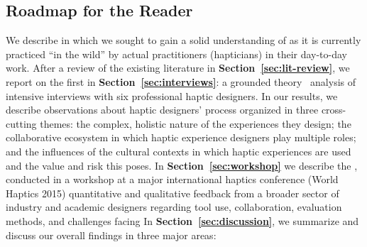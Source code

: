\subsection{Roadmap for the Reader}
\noindent
We describe  in which we sought to gain a solid understanding of %
\haxd as it is currently practiced ``in the wild'' by actual practitioners (hapticians) in their day-to-day work.
After a review of the existing literature in \textbf{Section~\ref{sec:lit-review}},
we report on the first  in \textbf{Section~\ref{sec:interviews}}: a grounded theory~\citep{Corbin2008} analysis of intensive interviews with six professional haptic designers.
In our results, we describe observations about haptic designers' process 
organized in three cross-cutting themes:
the complex, holistic nature of the experiences they design; 
the collaborative ecosystem in which haptic experience designers play multiple roles; 
and the influences of the cultural contexts in which haptic experiences are used and the value and risk this poses.
%
In \textbf{Section~\ref{sec:workshop}} we describe the , conducted in a workshop at a major international haptics conference (World Haptics 2015) quantitative and qualitative feedback from a broader sector of industry and academic designers regarding tool use, collaboration, evaluation methods, and challenges facing 
%
In \textbf{Section~\ref{sec:discussion}}, we summarize and discuss our overall findings in three major areas:
